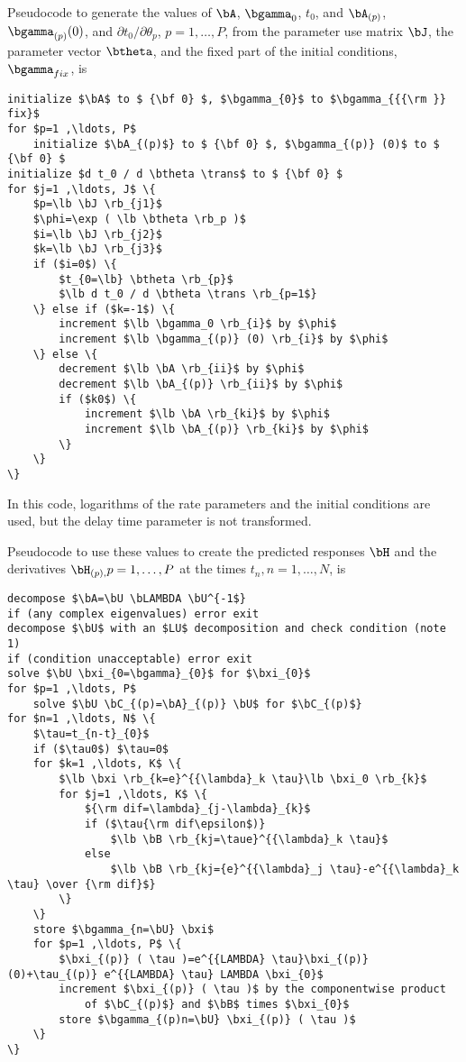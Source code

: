 {Pseudocode to generate the values of $\bA$,
$\bgamma_{0}$,
$t_{0}$,
and
$\bA_{(p)}$,
$\bgamma_{(p)} (0)$, and
$\partial t_0 / \partial \theta_{p}$, $p=1 ,\ldots, P$,
from the parameter use matrix
$\bJ$, the parameter vector $\btheta$, and the fixed part of the
initial conditions, $\bgamma_{{{\rm }} fix}$, is
\begin{verbatim}
initialize $\bA$ to $ {\bf 0} $, $\bgamma_{0}$ to $\bgamma_{{{\rm }} fix}$
for $p=1 ,\ldots, P$
    initialize $\bA_{(p)$} to $ {\bf 0} $, $\bgamma_{(p)} (0)$ to $ {\bf 0} $
initialize $d t_0 / d \btheta \trans$ to $ {\bf 0} $
for $j=1 ,\ldots, J$ \{
    $p=\lb \bJ \rb_{j1}$
    $\phi=\exp ( \lb \btheta \rb_p )$
    $i=\lb \bJ \rb_{j2}$
    $k=\lb \bJ \rb_{j3}$
    if ($i=0$) \{
        $t_{0=\lb} \btheta \rb_{p}$
        $\lb d t_0 / d \btheta \trans \rb_{p=1$}
    \} else if ($k=-1$) \{
        increment $\lb \bgamma_0 \rb_{i}$ by $\phi$
        increment $\lb \bgamma_{(p)} (0) \rb_{i}$ by $\phi$
    \} else \{
        decrement $\lb \bA \rb_{ii}$ by $\phi$
        decrement $\lb \bA_{(p)} \rb_{ii}$ by $\phi$
        if ($k0$) \{
            increment $\lb \bA \rb_{ki}$ by $\phi$
            increment $\lb \bA_{(p)} \rb_{ki}$ by $\phi$
        \}
    \}
\}
\end{verbatim}
In this code, logarithms of the rate parameters and the initial
conditions are used, but the delay time parameter is not transformed.

Pseudocode to use these values to create the predicted responses $\bH$
and the derivatives $\bH_{(p),}p=1 ,\ldots, P$ at the times
$t_n ,n=1 ,\ldots, N$, is
\begin{verbatim}
decompose $\bA=\bU \bLAMBDA \bU^{-1$}
if (any complex eigenvalues) error exit
decompose $\bU$ with an $LU$ decomposition and check condition (note 1)
if (condition unacceptable) error exit
solve $\bU \bxi_{0=\bgamma}_{0}$ for $\bxi_{0}$
for $p=1 ,\ldots, P$
    solve $\bU \bC_{(p)=\bA}_{(p)} \bU$ for $\bC_{(p)$}
for $n=1 ,\ldots, N$ \{
    $\tau=t_{n-t}_{0}$
    if ($\tau0$) $\tau=0$
    for $k=1 ,\ldots, K$ \{
        $\lb \bxi \rb_{k=e}^{{\lambda}_k \tau}\lb \bxi_0 \rb_{k}$
        for $j=1 ,\ldots, K$ \{
            ${\rm dif=\lambda}_{j-\lambda}_{k}$
            if ($\tau{\rm dif\epsilon$)}
                $\lb \bB \rb_{kj=\taue}^{{\lambda}_k \tau}$
            else
                $\lb \bB \rb_{kj={e}^{{\lambda}_j \tau}-e^{{\lambda}_k \tau} \over {\rm dif}$}
        \}
    \}
    store $\bgamma_{n=\bU} \bxi$
    for $p=1 ,\ldots, P$ \{
        $\bxi_{(p)} ( \tau )=e^{{LAMBDA} \tau}\bxi_{(p)} (0)+\tau_{(p)} e^{{LAMBDA} \tau} LAMBDA \bxi_{0}$
        increment $\bxi_{(p)} ( \tau )$ by the componentwise product
            of $\bC_{(p)$} and $\bB$ times $\bxi_{0}$
        store $\bgamma_{(p)n=\bU} \bxi_{(p)} ( \tau )$
    \}
\}
\end{verbatim}

}
